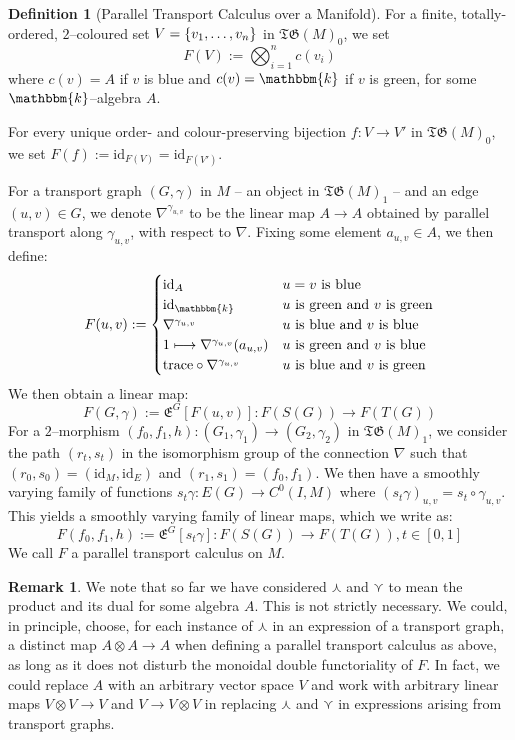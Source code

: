 \documentclass{amsart}
\newcommand{\K}{\mathbbm{k}}
\newcommand{\tensor}{\otimes}
\newcommand{\cwedge}{\curlywedge}
\newcommand{\cvee}{\curlyvee}
\renewcommand{\to}[1][]{\stackrel{#1}{\longrightarrow}}
\renewcommand{\mapsto}{\longmapsto}
\newcommand{\id}{\text{id}}
\newcommand{\br}[1]{\left( #1 \right)}
\newcommand{\curly}[1]{\left\{ #1 \right\}}
\newcommand{\set}[2][]{\ifthenelse{\equal{#1}{}}
                                  {\curly{#2}}
                                  {\curly{#1\ \textbf{:}\ #2}}}
\newcommand{\TG}{\mathfrak{TG}}
\newcommand{\Exp}[1]{\mathfrak{E}^{#1}}
\numberwithin{thm}{section}
\theoremstyle{definition}
\newtheorem{defn}[thm]{Definition}
\newtheorem{rmk}[thm]{Remark}
\begin{document}
\begin{defn}[Parallel Transport Calculus over a Manifold]\label{defn:sing_man_tqft}
For a finite, totally-ordered, $2$--coloured set
$V = \set{v_1, \dots, v_n}$ in $\TG(M)_0$, we set
\[
  F(V) := \bigotimes_{i = 1}^{n} c(v_i)
\]
where $c(v) = A$ if $v$ is blue and $c(v) = \K$ if $v$ is green,
for some $\K$--algebra $A$.

For every unique order- and colour-preserving bijection $f : V \to V'$ in
$\TG(M)_0$, we set $F(f) := \id_{F(V)} = \id_{F(V')}$.

For a transport graph $(G, \gamma)$ in $M$ -- an object in $\TG(M)_1$ -- and an
edge $(u, v) \in G$, we denote $\nabla^{\gamma_{u, v}}$ to be the linear map
$A \to A$ obtained by parallel transport along $\gamma_{u, v}$, with respect to
$\nabla$. Fixing some element $a_{u, v} \in A$, we then define:
\[
  F(u, v) := \begin{cases}
    \id_A
      & u = v \text{ is blue} \\
    \id_{\K} %
      & u \text{ is green and } v \text{ is green} \\
    \nabla^{\gamma_{u, v}}
      & u \text{ is blue and } v \text{ is blue} \\
    1 \mapsto \nabla^{\gamma_{u, v}}(a_{u, v})
      & u \text{ is green and } v \text{ is blue} \\
    \text{trace} \circ \nabla^{\gamma_{u, v}}
      & u \text{ is blue and } v \text{ is green}
  \end{cases}
\]
We then obtain a linear map:
\[
  F(G, \gamma) := \Exp{G}[F(u, v)]
               :  F(S(G)) \to F(T(G))
\]
For a $2$--morphism
$(f_0, f_1, h) : (G_1, \gamma_1) \to (G_2, \gamma_2)$ in $\TG(M)_1$, we consider
the path $(r_t, s_t)$ in the isomorphism group of the connection $\nabla$ such
that $(r_0, s_0) = (\id_M, \id_E)$ and $(r_1, s_1) = (f_0, f_1)$. We then have a
smoothly varying family of functions $s_t\gamma : E(G) \to C^0(I, M)$
where $(s_t\gamma)_{u, v} = s_t \circ \gamma_{u, v}$. This yields a smoothly
varying family of linear maps, which we write as:
\[
  F(f_0, f_1, h) := \Exp{G}[s_t\gamma]
    : F(S(G)) \to F(T(G)), t \in [0, 1]
\]
We call $F$ a parallel transport calculus on $M$.
\end{defn}

\begin{rmk}\label{rmk:any_vect_space}
We note that so far we have considered $\cwedge$ and $\cvee$ to mean the product
and its dual for some algebra $A$. This is not strictly necessary. We could, in
principle, choose, for each instance of $\cwedge$ in an expression of a
transport graph, a distinct map $A \tensor A \to A$ when defining a parallel
transport calculus as above, as long as it does not disturb the monoidal double
functoriality of $F$. In fact, we could replace $A$ with an arbitrary vector
space $V$ and work with arbitrary linear maps $V \tensor V \to V$ and
$V \to V \tensor V$ in replacing $\cwedge$ and $\cvee$ in expressions arising
from transport graphs.
\end{rmk}
\end{document}
